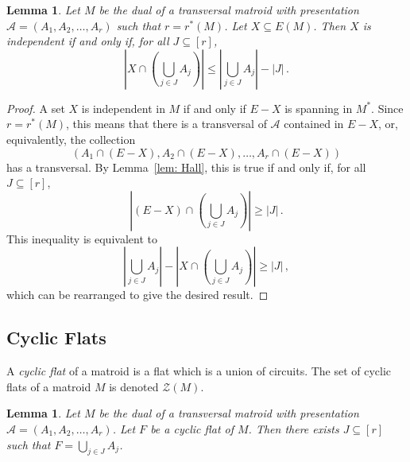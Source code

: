 \documentclass[11pt, reqno]{amsart}
\newtheorem{lemma}[theorem]{Lemma}
\begin{document}
\begin{lemma} \label{lem: independent}
Let $M$ be the dual of a transversal matroid with presentation $\mathcal A = (A_1, A_2, \ldots, A_r)$ such that $r = r^*(M)$. Let $X \subseteq E(M)$. Then $X$ is independent if and only if, for all $J \subseteq [r]$, 
$$
\left|X \cap \left(\bigcup_{j \in J} A_j\right)\right| \leq \left|\bigcup_{j \in J} A_j\right| - \left|J\right| \,.
	$$
\end{lemma}

\begin{proof}
A set $X$ is independent in $M$ if and only if $E - X$ is spanning in $M^*$. Since $r = r^*(M)$, this means that there is a transversal of $\mathcal A$ contained in $E - X$, or, equivalently, the collection
$$
(A_1 \cap (E - X), A_2 \cap (E - X), \ldots, A_r \cap (E - X))
$$
has a transversal. By Lemma~\ref{lem: Hall}, this is true if and only if, for all $J \subseteq [r]$,
$$
\left| (E - X) \cap \left( \bigcup_{j \in J} A_j \right) \right | \geq |J| \,.
$$
This inequality is equivalent to
$$
\left|\bigcup_{j \in J} A_j \right| - \left|X \cap \left(\bigcup_{j \in J} A_j \right) \right| \geq |J| \,,
$$
which can be rearranged to give the desired result.
\end{proof}

\subsection{Cyclic Flats}
A \emph{cyclic flat} of a matroid is a flat which is a union of circuits. The set of cyclic flats of a matroid $M$ is denoted $\mathcal Z(M)$.

\begin{lemma} \label{lem: flats}
Let $M$ be the dual of a transversal matroid with presentation $\mathcal A = (A_1, A_2, \ldots, A_r)$. Let $F$ be a cyclic flat of $M$. Then there exists $J \subseteq [r]$ such that $F = \bigcup_{j \in J} A_j$.
\end{lemma}
\end{document}
